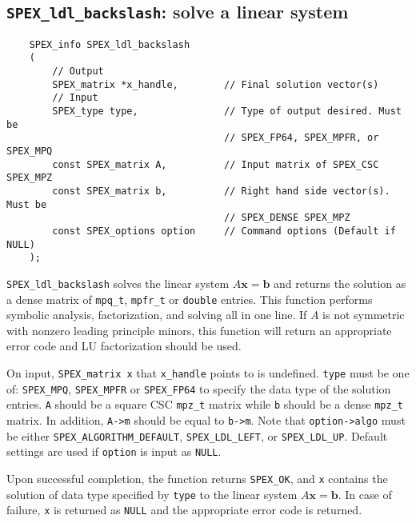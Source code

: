 \documentclass[12pt,oneside]{book}
\theoremstyle{definition}
\renewcommand{\b}{\mathbf{b}}
\newcommand{\x}{\mathbf{x}}
\begin{document}
\subsection{\texttt{SPEX\_ldl\_backslash}: solve a linear system}
\label{ss:SPEX_ldl_backslash}
\begin{mdframed}[userdefinedwidth=\textwidth]
{\footnotesize
\begin{verbatim}
    SPEX_info SPEX_ldl_backslash
    (
        // Output
        SPEX_matrix *x_handle,        // Final solution vector(s)
        // Input
        SPEX_type type,               // Type of output desired. Must be
                                      // SPEX_FP64, SPEX_MPFR, or SPEX_MPQ
        const SPEX_matrix A,          // Input matrix of SPEX_CSC SPEX_MPZ
        const SPEX_matrix b,          // Right hand side vector(s). Must be
                                      // SPEX_DENSE SPEX_MPZ 
        const SPEX_options option     // Command options (Default if NULL)
    );
\end{verbatim}
} \end{mdframed}

\verb|SPEX_ldl_backslash| solves the linear system $A\x=\b$ and returns the solution
as a dense matrix of \verb|mpq_t|, \verb|mpfr_t| or \verb|double| entries. This
function performs symbolic analysis, factorization, and solving all in one line. 
If $A$ is not symmetric with nonzero leading principle minors,
this function will return an appropriate error code and 
LU factorization should be used.

On input, \verb|SPEX_matrix x| that \verb|x_handle| points to is undefined. \verb|type| must be one of:
\verb|SPEX_MPQ|, \verb|SPEX_MPFR| or \verb|SPEX_FP64| to specify the data type
of the solution entries. \verb|A| should be a square CSC \verb|mpz_t| matrix
while \verb|b| should be a dense \verb|mpz_t| matrix. In addition, \verb|A->m|
should be equal to \verb|b->m|. Note that \verb|option->algo| must be either 
\verb|SPEX_ALGORITHM_DEFAULT|, \verb|SPEX_LDL_LEFT|, or \verb|SPEX_LDL_UP|.
Default settings are used if
\verb|option| is input as \verb|NULL|.

Upon successful completion, the function returns \verb|SPEX_OK|, and
\verb|x| contains the solution of data type specified by
\verb|type| to the linear system $A\x=\b$. In case of failure, 
\verb|x| is returned as \verb|NULL| and the appropriate error code is returned.
\end{document}

